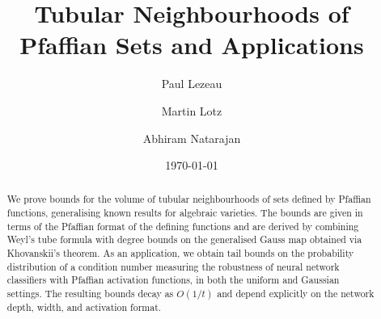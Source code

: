 \documentclass[11pt,a4paper]{amsart}
\title{Tubular Neighbourhoods of Pfaffian Sets and Applications}
\author{Paul Lezeau}
\author{Martin Lotz}
\author{Abhiram Natarajan}
\date{\today}
\begin{document}
\maketitle

\begin{abstract}
We prove bounds for the volume of tubular neighbourhoods of sets defined by Pfaffian functions, generalising known results for algebraic varieties. The bounds are given in terms of the Pfaffian format of the defining functions and are derived by combining Weyl's tube formula with degree bounds on the generalised Gauss map obtained via Khovanskii's theorem. As an application, we obtain tail bounds on the probability distribution of a condition number measuring the robustness of neural network classifiers with Pfaffian activation functions, in both the uniform and Gaussian settings. The resulting bounds decay as $O(1/t)$ and depend explicitly on the network depth, width, and activation format.
\end{abstract}


\tableofcontents













\appendix



%

%

%



\end{document}
